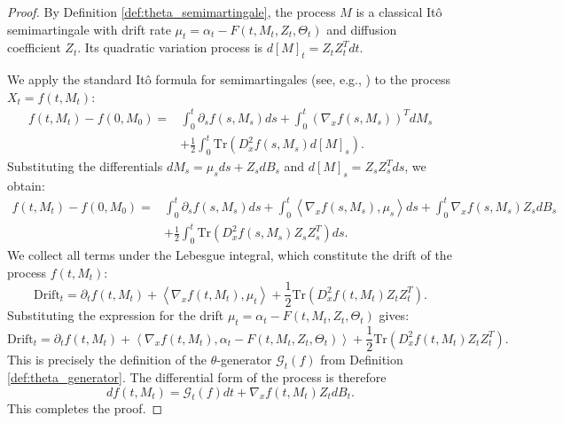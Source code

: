 \documentclass[12pt, letterpaper]{amsart}
\newcommand{\scpr}[2]{\left\langle #1, #2 \right\rangle}
\newcommand{\Tr}{\mathrm{Tr}}
\theoremstyle{plain}
\theoremstyle{definition}
\theoremstyle{remark}
\numberwithin{equation}{section} %
\begin{document}
\begin{proof}
By Definition \ref{def:theta_semimartingale}, the process \(M\) is a classical Itô semimartingale with drift rate \(\mu_t = \alpha_t - F(t, M_t, Z_t, \Theta_t)\) and diffusion coefficient \(Z_t\). Its quadratic variation process is \(d[M]_t = Z_t Z_t^T dt\).

We apply the standard Itô formula for semimartingales (see, e.g., \cite[Chapter IV, Theorem 1.5]{RevuzYor1999}) to the process \(X_t = f(t, M_t)\):
\begin{align*}
    f(t, M_t) - f(0, M_0) = & \int_0^t \partial_s f(s, M_s) ds + \int_0^t (\nabla_x f(s, M_s))^T dM_s \\
    & + \frac{1}{2} \int_0^t \Tr\left( D^2_x f(s, M_s) d[M]_s \right).
\end{align*}
Substituting the differentials \(dM_s = \mu_s ds + Z_s dB_s\) and \(d[M]_s = Z_s Z_s^T ds\), we obtain:
\begin{align*}
    f(t, M_t) - f(0, M_0) = & \int_0^t \partial_s f(s, M_s) ds + \int_0^t \scpr{\nabla_x f(s, M_s)}{\mu_s} ds + \int_0^t \nabla_x f(s, M_s) Z_s dB_s \\
    & + \frac{1}{2} \int_0^t \Tr\left( D^2_x f(s, M_s) Z_s Z_s^T \right) ds.
\end{align*}
We collect all terms under the Lebesgue integral, which constitute the drift of the process $f(t, M_t)$:
\[ \text{Drift}_t = \partial_t f(t, M_t) + \scpr{\nabla_x f(t, M_t)}{\mu_t} + \frac{1}{2}\Tr\left( D^2_x f(t, M_t) Z_t Z_t^T \right). \]
Substituting the expression for the drift \(\mu_t = \alpha_t - F(t, M_t, Z_t, \Theta_t)\) gives:
\[ \text{Drift}_t = \partial_t f(t, M_t) + \scpr{\nabla_x f(t, M_t)}{\alpha_t - F(t, M_t, Z_t, \Theta_t)} + \frac{1}{2}\Tr\left( D^2_x f(t, M_t) Z_t Z_t^T \right). \]
This is precisely the definition of the \(\theta\)-generator \(\mathcal{G}_t(f)\) from Definition \ref{def:theta_generator}. The differential form of the process is therefore
\[ df(t, M_t) = \mathcal{G}_t(f) dt + \nabla_x f(t, M_t) Z_t dB_t. \]
This completes the proof.
\end{proof}
\end{document}
